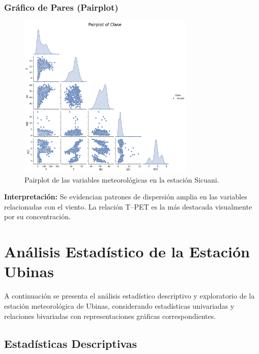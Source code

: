 \subsubsection*{Gráfico de Pares (Pairplot)}
\begin{figure}[htbp]
\centering
\includegraphics[width=0.75\textwidth]{resultados/por_estacion_meteorologica/Sicuani/pairplot.png}
\caption{Pairplot de las variables meteorológicas en la estación Sicuani.}
\label{fig:sicuani_pairplot}
\end{figure}
\textbf{Interpretación:} Se evidencian patrones de dispersión amplia en las variables relacionadas con el viento. La relación T–PET es la más destacada visualmente por su concentración.


\section{Análisis Estadístico de la Estación Ubinas}

A continuación se presenta el análisis estadístico descriptivo y exploratorio de la estación meteorológica de Ubinas, considerando estadísticas univariadas y relaciones bivariadas con representaciones gráficas correspondientes.

\subsection{Estadísticas Descriptivas}

